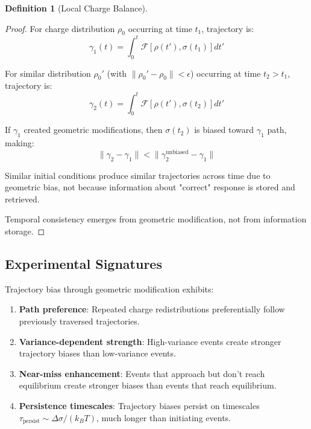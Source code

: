\documentclass[12pt,a4paper]{article}
\theoremstyle{plain}
\theoremstyle{definition}
\newtheorem{definition}[theorem]{Definition}
\theoremstyle{remark}
\begin{document}
\begin{definition}[Local Charge Balance]
\begin{proof}
For charge distribution $\rho_0$ occurring at time $t_1$, trajectory is:
\begin{equation}
\gamma_1(t) = \int_0^t \mathcal{F}[\rho(t'), \sigma(t_1)] dt'
\end{equation}

For similar distribution $\rho_0'$ (with $\|\rho_0' - \rho_0\| < \epsilon$) occurring at time $t_2 > t_1$, trajectory is:
\begin{equation}
\gamma_2(t) = \int_0^t \mathcal{F}[\rho(t'), \sigma(t_2)] dt'
\end{equation}

If $\gamma_1$ created geometric modifications, then $\sigma(t_2)$ is biased toward $\gamma_1$ path, making:
\begin{equation}
\|\gamma_2 - \gamma_1\| < \|\gamma_2^{\text{unbiased}} - \gamma_1\|
\end{equation}

Similar initial conditions produce similar trajectories across time due to geometric bias, not because information about "correct" response is stored and retrieved.

Temporal consistency emerges from geometric modification, not from information storage.
\end{proof}

\subsection{Experimental Signatures}

Trajectory bias through geometric modification exhibits:

\begin{enumerate}
\item \textbf{Path preference}: Repeated charge redistributions preferentially follow previously traversed trajectories.

\item \textbf{Variance-dependent strength}: High-variance events create stronger trajectory biases than low-variance events.

\item \textbf{Near-miss enhancement}: Events that approach but don't reach equilibrium create stronger biases than events that reach equilibrium.

\item \textbf{Persistence timescales}: Trajectory biases persist on timescales $\tau_{\text{persist}} \sim \Delta \sigma / (k_B T)$, much longer than initiating events.


\end{enumerate}
\end{definition}
\end{document}
